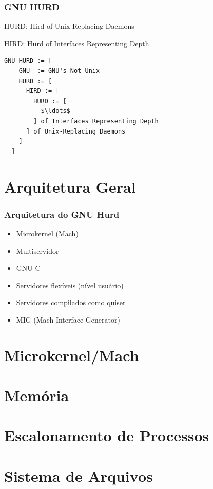 \documentclass[10pt]{beamer}
\theoremstyle{plain}
\begin{document}
\begin{frame}[fragile]
  \frametitle{GNU HURD}

  HURD: Hird of Unix-Replacing Daemons

  HIRD: Hurd of Interfaces Representing Depth

  \begin{lstlisting}[mathescape=true,showstringspaces=false,numbers=none,frame=single]
  GNU HURD := [
    GNU  := GNU's Not Unix
    HURD := [
      HIRD := [
        HURD := [
          $\ldots$
        ] of Interfaces Representing Depth
      ] of Unix-Replacing Daemons
    ]
  ]
  \end{lstlisting}

\end{frame}

\section{Arquitetura Geral}

\begin{frame}
  \frametitle{Arquitetura do GNU Hurd}

  \begin{itemize}
    \item Microkernel (Mach)
    \item Multiservidor
    \item GNU C
    \item Servidores flexíveis (nível usuário)
    \item Servidores compilados como quiser
    \item MIG (Mach Interface Generator)
  \end{itemize}
\end{frame}

\section{Microkernel/Mach}



\section{Memória}

\section{Escalonamento de Processos}

\section{Sistema de Arquivos}
\end{document}
